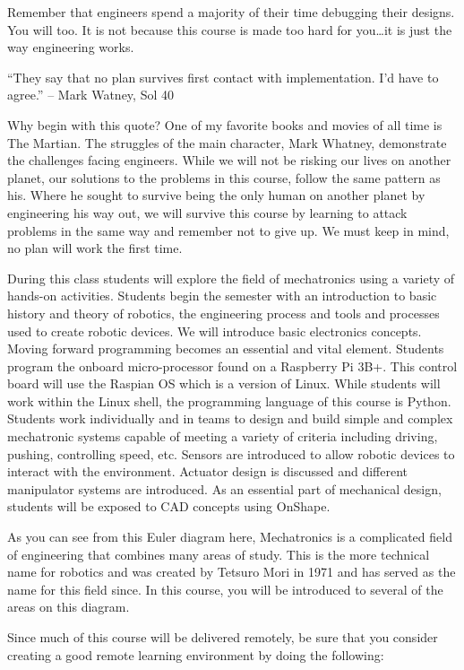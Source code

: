 \documentclass[
]{book}
\begin{document}
Remember that engineers spend a majority of their time debugging their designs. You will too. It is not because this course is made too hard for you\ldots it is just the way engineering works.

``They say that no plan survives first contact with implementation. I'd have to agree.'' -- Mark Watney, Sol 40

Why begin with this quote? One of my favorite books and movies of all time is The Martian. The struggles of the main character, Mark Whatney, demonstrate the challenges facing engineers. While we will not be risking our lives on another planet, our solutions to the problems in this course, follow the same pattern as his. Where he sought to survive being the only human on another planet by engineering his way out, we will survive this course by learning to attack problems in the same way and remember not to give up. We must keep in mind, no plan will work the first time.

During this class students will explore the field of mechatronics using a variety of hands-on activities. Students begin the semester with an introduction to basic history and theory of robotics, the engineering process and tools and processes used to create robotic devices. We will introduce basic electronics concepts. Moving forward programming becomes an essential and vital element. Students program the onboard micro-processor found on a Raspberry Pi 3B+. This control board will use the Raspian OS which is a version of Linux. While students will work within the Linux shell, the programming language of this course is Python. Students work individually and in teams to design and build simple and complex mechatronic systems capable of meeting a variety of criteria including driving, pushing, controlling speed, etc. Sensors are introduced to allow robotic devices to interact with the environment. Actuator design is discussed and different manipulator systems are introduced. As an essential part of mechanical design, students will be exposed to CAD concepts using OnShape.

As you can see from this Euler diagram here, Mechatronics is a complicated field of engineering that combines many areas of study. This is the more technical name for robotics and was created by Tetsuro Mori in 1971 and has served as the name for this field since. In this course, you will be introduced to several of the areas on this diagram.

Since much of this course will be delivered remotely, be sure that you consider creating a good remote learning environment by doing the following:
\end{document}
